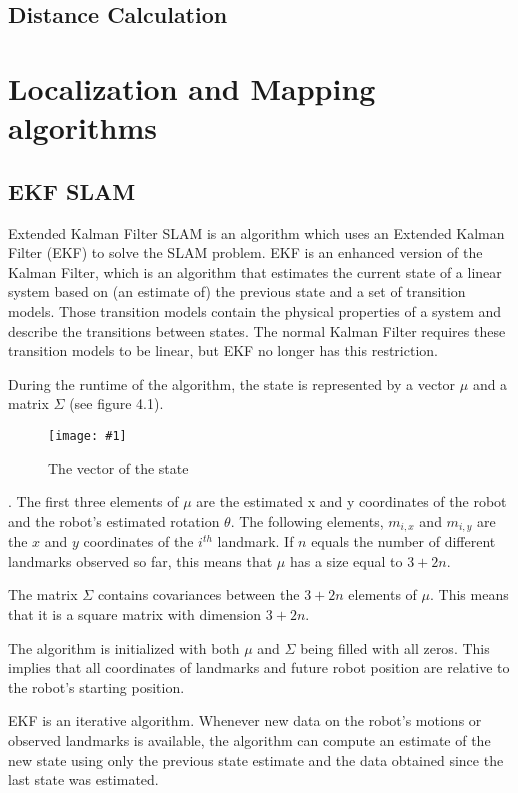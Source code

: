 \documentclass{ba-kecs}
\numberwithin{figure}{section}
\numberwithin{equation}{section}
\newcommand{\dkepic}[2]{ %
	\begin{figure}[H] %
	\texttt{[image: \#1]}
	\caption{#2}
	\label{#1}
	\end{figure}
}
\begin{document}
\subsection{Distance Calculation}



\section{Localization and Mapping algorithms}

\subsection{EKF SLAM}
Extended Kalman Filter SLAM is an algorithm which uses an Extended Kalman Filter (EKF) to solve the SLAM problem. EKF is an enhanced version of the Kalman Filter, which is an algorithm that estimates the current state of a linear system based on (an estimate of) the previous state and a set of transition models. Those transition models contain the physical properties of a system and describe the transitions between states. The normal Kalman Filter requires these transition models to be linear, but EKF no longer has this restriction.

During the runtime of the algorithm, the state is represented by a vector $\mu$ and a matrix $\Sigma$ (see figure 4.1).
\dkepic{bigMatrix}{The vector of the state \cite{vec}}. 
The first three elements of $\mu$ are the estimated x and y coordinates of the robot and the robot’s estimated rotation $\theta$. The following elements, $m_{i,x}$ and $m_{i,y}$ are the $x$ and $y$ coordinates of the $i^{th}$ landmark. If $n$ equals the number of different landmarks observed so far, this means that $\mu$ has a size equal to $3 + 2n$.

The matrix $\Sigma$ contains covariances between the $3 + 2n$ elements of $\mu$. This means that it is a square matrix with dimension $3 + 2n$.

The algorithm is initialized with both $\mu$ and $\Sigma$ being filled with all zeros. This implies that all coordinates of landmarks and future robot position are relative to the robot’s starting position.

EKF is an iterative algorithm. Whenever new data on the robot’s motions or observed landmarks is available, the algorithm can compute an estimate of the new state using only the previous state estimate and the data obtained since the last state was estimated.
\end{document}
